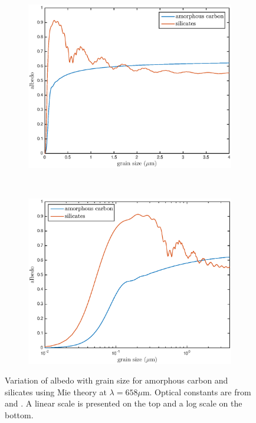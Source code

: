 \begin{figure}
\begin{subfigure}{1\textwidth}
\centering
\includegraphics[trim =37 10 45 15,clip=true,scale=0.75]{chapters/chapter4/images/albedo_grainsize_upto4}
\end{subfigure}\\[1ex]
\begin{subfigure}{1\textwidth}
\centering
\includegraphics[trim =35 10 45 15,clip=true,scale=0.75]{chapters/chapter4/images/albedo_grainsize_upto4_log}
\end{subfigure}
\caption{Variation of albedo with grain size for amorphous carbon and silicates using Mie theory at $\lambda = 658 \mu $m. Optical constants are from \citet{Zubko1996} and \citet{Draine1984}. A linear scale is presented on the top and a log scale on the bottom.}
\label{albedo_grain}
\end{figure}

